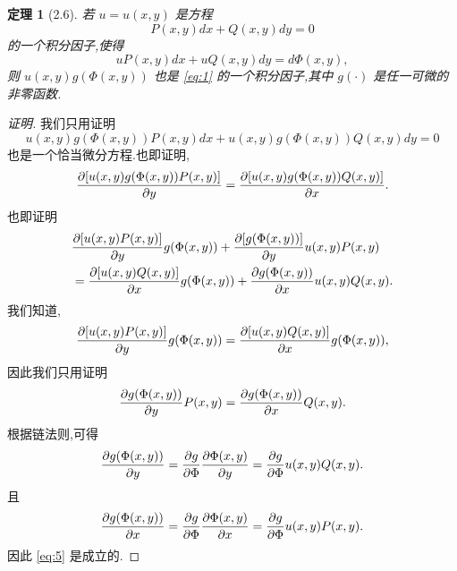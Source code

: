 \documentclass[a4paper, 12pt]{article} %
\newtheorem*{adtheorem}{定理}
\newenvironment{theorem}
{\bigskip\begin{mdframed}[backgroundcolor=gray!40,rightline=false,leftline=false,topline=false,bottomline=false]\begin{adtheorem}}
    {\end{adtheorem}\end{mdframed}\bigskip}
\begin{document}
\begin{CJK}{UTF8}{gkai}
  \begin{theorem}[2.6]
若 $u=u(x,y)$ 是方程
\begin{equation}
  \label{eq:1}
  P(x,y)dx+Q(x,y)dy=0
\end{equation}
的一个积分因子,使得
\begin{equation}
  \label{eq:2}
  uP(x,y)dx+uQ(x,y)dy=d\Phi(x,y),
\end{equation}
则 $u(x,y)g(\Phi(x,y))$ 也是 \eqref{eq:1} 的一个积分因子,其中
$g(\cdot)$ 是任一可微的非零函数.
  \end{theorem}
  \begin{proof}[证明]
我们只用证明
\begin{equation}
  \label{eq:3}
  u(x,y)g(\Phi(x,y))P(x,y)dx+u(x,y)g(\Phi(x,y))Q(x,y)dy=0
\end{equation}
也是一个恰当微分方程.也即证明,
\begin{equation}
  \label{eq:4}
  \frac{\partial [u(x,y)g(\Phi(x,y))P(x,y)]}{\partial y}=\frac{\partial
    [u(x,y)g(\Phi(x,y))Q(x,y)]}{\partial x}.
\end{equation}
也即证明
\begin{align*}
  &\frac{\partial [u(x,y)P(x,y)]}{\partial y}g(\Phi(x,y))+\frac{\partial
    [g(\Phi(x,y))]}{\partial y}u(x,y)P(x,y)\\&=\frac{\partial [u(x,y)Q(x,y)]}{\partial
    x}g(\Phi(x,y))+\frac{\partial g(\Phi(x,y))}{\partial x}u(x,y)Q(x,y).
\end{align*}
我们知道,
$$
\frac{\partial [u(x,y)P(x,y)]}{\partial y}g(\Phi(x,y))=\frac{\partial
  [u(x,y)Q(x,y)]}{\partial x}g(\Phi(x,y)),
$$
因此我们只用证明
\begin{equation}
  \label{eq:5}
  \frac{\partial g(\Phi(x,y))}{\partial y}P(x,y)=\frac{\partial g(\Phi(x,y))}{\partial x}Q(x,y).
\end{equation}
根据链法则,可得
$$
\frac{\partial g(\Phi(x,y))}{\partial y}=\frac{\partial g}{\partial \Phi}\frac{\partial
  \Phi(x,y)}{\partial y}=\frac{\partial g}{\partial\Phi }u(x,y)Q(x,y).
$$
且
$$
\frac{\partial g(\Phi(x,y))}{\partial x}=\frac{\partial g}{\partial \Phi}\frac{\partial
  \Phi(x,y)}{\partial x}=\frac{\partial g}{\partial\Phi}u(x,y)P(x,y).
$$
因此 \eqref{eq:5} 是成立的.
  \end{proof}

  
  
  
  
  
\end{CJK}
\end{document}
